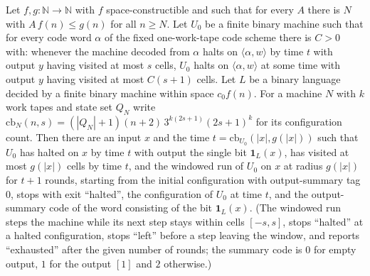 \begin{lemma}
\label{Complexity.sph_code_window}
\leanok
{}
Let $f,g:\mathbb{N}\to\mathbb{N}$ with $f$ space-constructible and such that for every $A$ there is
$N$ with $A\,f(n)\le g(n)$ for all $n\ge N$. Let $U_0$ be a finite binary machine such that for every
code word $\alpha$ of the fixed one-work-tape code scheme there is $C>0$ with: whenever the machine
decoded from $\alpha$ halts on $\langle\alpha,w\rangle$ by time $t$ with output $y$ having visited at
most $s$ cells, $U_0$ halts on $\langle\alpha,w\rangle$ at some time with output $y$ having visited
at most $C(s+1)$ cells. Let $L$ be a binary language decided by a finite binary machine within space
$c_0 f(n)$. For a machine $N$ with $k$ work tapes and state set $Q_N$ write
$\mathrm{cb}_N(n,s)=(|Q_N|+1)(n+2)\,3^{k(2s+1)}(2s+1)^{k}$ for its configuration count. Then there are an input $x$ and the time
$t=\mathrm{cb}_{U_0}(|x|,g(|x|))$ such that $U_0$ has halted on $x$ by time $t$ with output the
single bit $\mathbf{1}_L(x)$, has visited at most $g(|x|)$ cells by time $t$, and the windowed run
of $U_0$ on $x$ at radius $g(|x|)$ for $t+1$ rounds, starting from the initial configuration with
output-summary tag $0$, stops with exit ``halted'', the configuration of $U_0$ at time $t$, and the
output-summary code of the word consisting of the bit $\mathbf{1}_L(x)$. (The windowed run steps
the machine while its next step stays within cells $[-s,s]$, stops ``halted'' at a halted
configuration, stops ``left'' before a step leaving the window, and reports ``exhausted'' after
the given number of rounds; the summary code is $0$ for empty output, $1$ for the output $[1]$ and
$2$ otherwise.)
\end{lemma}

